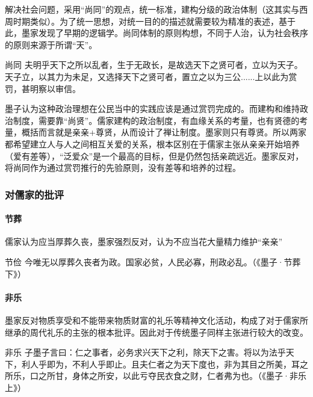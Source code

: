 解决社会问题，采用“尚同”的观点，统一标准，建构分级的政治体制（这其实与西周时期类似）。为了统一思想，对统一目的的描述就需要较为精准的表述，基于此，墨家发现了早期的逻辑学。尚同体制的原则构想，不同于人治，认为社会秩序的原则来源于所谓“天”。

\begin{fancybox}{尚同}
    夫明乎天下之所以乱者，生于无政长，是故选天下之贤可者，立以为天子。天子立，以其力为未足，又选择天下之贤可者，置立之以为三公......上以此为赏罚，甚明察以审信。
\end{fancybox}

墨子认为这种政治理想在公民当中的实践应该是通过赏罚完成的。而建构和维持政治制度，需要靠“尚贤”。儒家建构的政治制度，有血缘关系的考量，也有贤德的考量，概括而言就是亲亲+尊贤，从而设计了禅让制度。墨家则只有尊贤。所以两家都希望建立人与人之间相互关爱的关系，根本区别在于儒家主张从亲亲开始培养（爱有差等），“泛爱众”是一个最高的目标，但是仍然包括亲疏远近。墨家反对，将尚同作为通过赏罚推行的先验原则，没有差等和培养的过程。

\subsubsection{对儒家的批评}

\paragraph{节葬}

儒家认为应当厚葬久丧，墨家强烈反对，认为不应当花大量精力维护“亲亲”

\begin{fancybox}{节俭}
    今唯无以厚葬久丧者为政。国家必贫，人民必寡，刑政必乱。（《墨子·节葬下》）
\end{fancybox}

\paragraph{非乐}

墨家反对物质享受和不能带来物质财富的礼乐等精神文化活动，构成了对于儒家所继承的周代礼乐的主张的根本批评。因此对于传统墨子同样主张进行较大的改变。

\begin{fancybox}{非乐}
    子墨子言曰：仁之事者，必务求兴天下之利，除天下之害。将以为法乎天下，利人乎即为，不利人乎即止。且夫仁者之为天下度也，非为其目之所美，耳之所乐，口之所甘，身体之所安，以此亏夺民衣食之财，仁者弗为也。（《墨子·非乐上》）
\end{fancybox}

